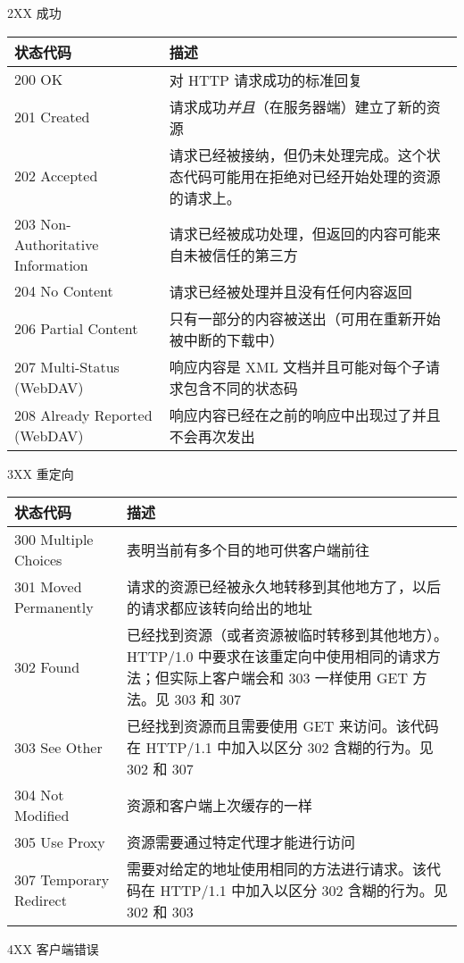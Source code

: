 \documentclass[final,table]{beamer}
\begin{document}
\begin{frame}{}
\begin{block}{\huge 2XX 成功}
      \begin{tabular}{p{} p{}}
        状态代码 & 描述 \\ \hline
        200 OK & 对 HTTP 请求成功的标准回复 \\
        201 Created & 请求成功\emph{并且}（在服务器端）建立了新的资源 \\
        202 Accepted & 请求已经被接纳，但仍未处理完成。这个状态代码可能用在拒绝对已经开始处理的资源的请求上。\\
        203 Non-Authoritative Information & 请求已经被成功处理，但返回的内容可能来自未被信任的第三方 \\
        204 No Content & 请求已经被处理并且没有任何内容返回 \\
        206 Partial Content & 只有一部分的内容被送出（可用在重新开始被中断的下载中）\\
        207 Multi-Status (WebDAV) & 响应内容是 XML 文档并且可能对每个子请求包含不同的状态码 \\
        208 Already Reported (WebDAV) & 响应内容已经在之前的响应中出现过了并且不会再次发出 \\
      \end{tabular}
    \end{block}
    \begin{block}{\huge 3XX 重定向}

      \vspace{0.3in}

      \begin{tabular}{p{} p{}}
        状态代码 & 描述 \\ \hline
        300 Multiple Choices & 表明当前有多个目的地可供客户端前往 \\
        301 Moved Permanently & 请求的资源已经被永久地转移到其他地方了，以后的请求都应该转向给出的地址 \\
        302 Found & 已经找到资源（或者资源被临时转移到其他地方）。HTTP/1.0 中要求在该重定向中使用相同的请求方法；但实际上客户端会和 303 一样使用 GET 方法。见 303 和 307 \\
        303 See Other & 已经找到资源而且需要使用 GET 来访问。该代码在 HTTP/1.1 中加入以区分 302 含糊的行为。见 302 和 307 \\
        304 Not Modified & 资源和客户端上次缓存的一样 \\
        305 Use Proxy & 资源需要通过特定代理才能进行访问 \\
        307 Temporary Redirect & 需要对给定的地址使用相同的方法进行请求。该代码在 HTTP/1.1 中加入以区分 302 含糊的行为。见 302 和 303 \\
      \end{tabular}
    \end{block}
    \begin{block}{\huge 4XX 客户端错误}


\end{block}
\end{frame}
\end{document}
